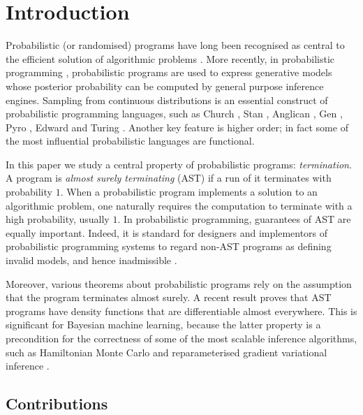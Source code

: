 
\section{Introduction}
\label{sec:intro}

Probabilistic (or randomised) programs have long been recognised as central to the efficient solution of algorithmic problems \cite{Rabin1976}.
More recently, in probabilistic programming \cite{DBLP:conf/icse/GordonHNR14,rainforth2017Automating,vandemeent2018Introduction}, probabilistic programs are used to express generative models whose posterior probability can be computed by general purpose inference engines.
Sampling from continuous distributions is an essential construct of probabilistic programming languages, such as Church \cite{DBLP:conf/uai/GoodmanMRBT08}, Stan \cite{carpenter2017stan}, Anglican \cite{DBLP:conf/pkdd/TolpinMW15}, Gen \cite{cusumano-towner2019Gen}, Pyro \cite{bingham2019Pyro}, Edward \cite{tran2016edward} and Turing \cite{ge2018Turing}.
Another key feature is higher order; in fact some of the most influential probabilistic languages are functional.

In this paper we study a central property of probabilistic programs: \emph{termination}. 
A program is \emph{almost surely terminating} (AST) if a run of it terminates with probability $1$.
When a probabilistic program implements a solution to an algorithmic problem, one naturally requires the computation to terminate with a high probability, usually $1$.
In probabilistic programming, guarantees of AST are equally important. 
Indeed, it is standard for designers and implementors of probabilistic programming systems to regard non-AST programs as defining invalid models, and hence inadmissible \cite{Rainforth2017,DBLP:conf/uai/GoodmanMRBT08}.

Moreover, various theorems about probabilistic programs rely on the assumption that the program terminates almost surely. 
A recent result \cite{MakOPW20} proves that AST programs have density functions that are differentiable almost everywhere.
This is significant for Bayesian machine learning, because the latter property is a precondition for the correctness of some of the most scalable inference algorithms, such as Hamiltonian Monte Carlo \cite{DBLP:conf/aistats/ZhouGKRYW19,Nishimura2020b} and reparameterised gradient variational inference \cite{DBLP:conf/nips/LeeYY18}.

\subsection*{Contributions}

